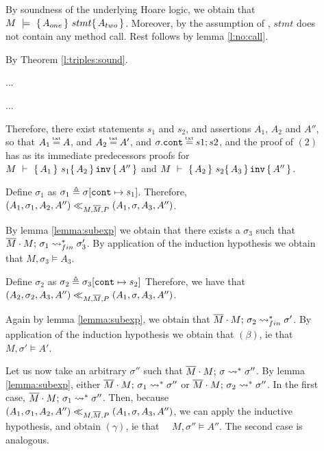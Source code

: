 \begin{description} 

\item[{}] 

By soundness of the underlying Hoare logic, we obtain that  $M\ \models\  \{\, A_{one} \, \}\ stmt \{\, A_{two} \, \}$. Moreover, 
by the assumption of {}, $stmt$ does not contain any method call. Rest follows by lemma \ref{l:no:call}.

\item[{}] 

By Theorem \ref{l:triples:sound}.

\item[{}] 

...

\item[{}] 
 ...

\item[{}] 
Therefore, there exist statements $s_1$ and $s_2$, and assertions  $A_1$, $A_2$ and $A''$, so that $A_1\txteq A$, and $A_2 \txteq A'$, and $\sigma.\prg{cont}\txteq  s1; s2$, and
the proof of  $(2)$ %
has as its immediate predecessors proofs for 
$M\ \vdash\   \{\, A_1 \, \}\ s_1 \{\, A_2 \, \} \, {\texttt{inv}}\, \{\, A'' \, \} $ and $ M\ \vdash\   \{\, A_2 \, \}\ s_2 \{\, A_3 \, \} \, {\texttt{inv}}\, \{\, A'' \, \} $.

Define $\sigma_1$ as  $\sigma_1 \triangleq \sigma[\mbox{\normalfont{\texttt{cont}}} \mapsto s_1]$.
Therefore,  $(A_1,\sigma_1,A_2, A'') \ll_{M,\overline{M},P} (A_1,\sigma,A_3, A'')$. 

By lemma \ref{lemma:subexp} we obtain that there exists a $\sigma_3$ such that $\overline{M}\cdot M;\, {\sigma_1} \rightsquigarrow^*_{fin} \sigma_3'$. 
 By application of the induction hypothesis we obtain that $M, \sigma_3  \models A_3$. 
 
 Define $\sigma_2$ as  $\sigma_2 \triangleq \sigma_3[\mbox{\normalfont{\texttt{cont}}} \mapsto s_2]$
Therefore, we have that $(A_2,\sigma_2,A_3,A'') \ll_{M,\overline{M},P} (A_1,\sigma,A_3, A'')$. 

 
Again by lemma \ref{lemma:subexp}, we obtain that $\overline{M}\cdot M;\, {\sigma_2} \rightsquigarrow^*_{fin} \sigma'$.  
 By application of the induction hypothesis we obtain that $(\beta)$, ie that \ \ $ M, \sigma' \models A'$.
 
Let us now take an arbitrary $\sigma''$ such that   $\overline{M}\cdot M;\, {\sigma} \rightsquigarrow^* \sigma''$. By
lemma  \ref{lemma:subexp}, either $\overline{M}\cdot M;\, {\sigma_1} \rightsquigarrow^* \sigma''$ or
$\overline{M}\cdot M;\, {\sigma_2} \rightsquigarrow^* \sigma''$. In the first case, $\overline{M}\cdot M;\, {\sigma_1} \rightsquigarrow^* \sigma''$. Then, because $(A_1,\sigma_1,A_2, A'') \ll_{M,\overline{M},P} (A_1,\sigma,A_3, A'')$, we can apply the inductive hypothesis, and obtain $(\gamma)$, ie that \ \ $ M, \sigma'' \models A''$. The second case is analogous.


\end{description}
